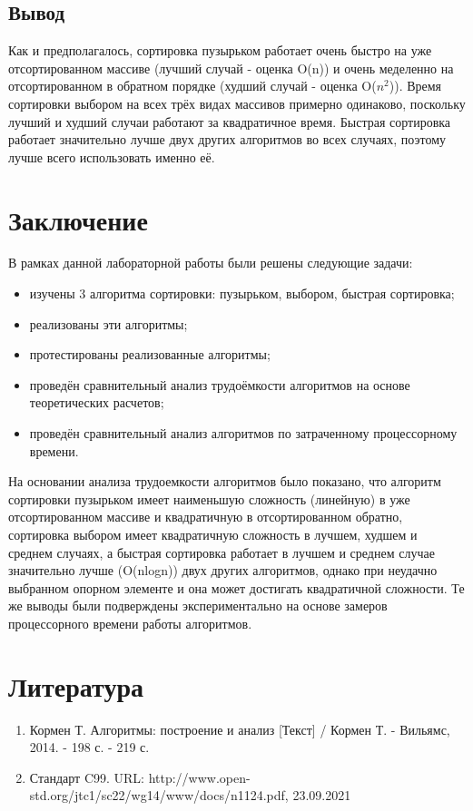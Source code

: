 \documentclass{report}
\begin{document}
\section{Вывод}

Как и предполагалось, сортировка пузырьком работает очень быстро на уже отсортированном массиве (лучший случай - оценка O(n)) и очень меделенно на отсортированном в обратном порядке (худший случай - оценка O($n^2$)). Время сортировки выбором на всех трёх видах массивов примерно одинаково, поскольку лучший и худший случаи работают за квадратичное время. Быстрая сортировка работает значительно лучше двух других алгоритмов во всех случаях, поэтому лучше всего использовать именно её.


\chapter*{Заключение}

В рамках данной лабораторной работы были решены следующие задачи:

\begin{itemize}
	\item изучены 3 алгоритма сортировки: пузырьком, выбором, быстрая сортировка;
	\item реализованы эти алгоритмы;
	\item протестированы реализованные алгоритмы;
	\item проведён сравнительный анализ трудоёмкости алгоритмов на основе теоретических расчетов;
	\item проведён сравнительный анализ алгоритмов по затраченному процессорному времени.
\end{itemize}

На основании анализа трудоемкости алгоритмов было показано, что алгоритм сортировки пузырьком имеет наименьшую сложность (линейную) в уже отсортированном массиве и квадратичную в отсортированном обратно, сортировка выбором имеет квадратичную сложность в лучшем, худшем и среднем случаях, а быстрая сортировка работает в лучшем и среднем случае значительно лучше (O(nlogn)) двух других алгоритмов, однако при неудачно выбранном опорном элементе и она может достигать квадратичной сложности. Те же выводы были подверждены экспериментально на основе замеров процессорного времени работы алгоритмов. 

\chapter*{Литература}
\begin{enumerate}
	\item Кормен Т. Алгоритмы: построение и анализ [Текст] / Кормен Т. - Вильямс, 2014. - 198 с. - 219 с.
	\item Стандарт C99. URL: http://www.open-std.org/jtc1/sc22/wg14/www/docs/n1124.pdf, 23.09.2021
\end{enumerate}
\end{document}
